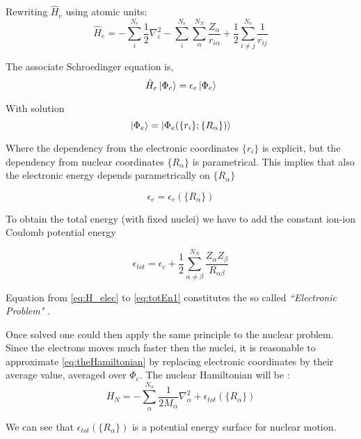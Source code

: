 \documentclass[a4paper,12pt]{article}
\begin{document}
Rewriting $\hat{H}_{e}$  using atomic units:
\begin{equation}\label{eq:H_elec}
	\hat{H}_{e} = 	- \sum_{i}^{N_{e}} \frac{1}{2} \nabla_{i}^2  
					- \sum_{i}^{N_{e}} \sum_{\alpha}^{N_{N}} \frac{Z_{\alpha}}{r_{i\alpha}}  
					+ \frac{1}{2} \sum_{i \neq j}^{N_{e}} \frac{1}{r_{ij}}
\end{equation}

The associate Schroedinger equation is,
\begin{equation}
	\hat{H}_{e} \ket{\Phi_{e}} = \epsilon_{e} \ket{\Phi_{e}}
\end{equation}

With solution
\begin{equation}
	\ket{\Phi_{e}} = \ket{\Phi_{e}( \{r_{i}\};\{R_{\alpha}\} )}
\end{equation}

Where the dependency from the electronic coordinates $\{r_i\}$ is explicit, but the dependency from nuclear coordinates $\{R_{\alpha}\}$ is parametrical.
This implies that also the electronic energy depends parametrically on $\{R_{\alpha}\}$

\begin{equation}
	\epsilon_{e} = \epsilon_{e}(\{R_{\alpha}\})
\end{equation}

To obtain the total energy (with fixed nuclei) we have to add the constant ion-ion Coulomb potential energy

\begin{equation}\label{eq:totEn1}
	\epsilon_{tot} = \epsilon_{e} + \frac{1}{2} \sum_{\alpha \neq \beta}^{N_N} \frac{Z_{\alpha} Z_{\beta} }{R_{\alpha \beta}}
\end{equation}

Equation from \eqref{eq:H_elec} to \eqref{eq:totEn1} constitutes the so called \textit{``Electronic Problem"} \cite[p.44]{Attila}.

Once solved one could then apply the same principle to the nuclear problem.
Since the electrons moves much faster then the nuclei, it is reasonable to approximate \eqref{eq:theHamiltonian} by replacing electronic coordinates by their average value, averaged over $\Phi_{e}$.
The nuclear Hamiltonian will be :
\begin{equation}
	H_{N} = - \sum_{\alpha}^{N_{\alpha}} \frac{1}{2M_{\alpha}} \nabla_{\alpha}^2 + \epsilon_{tot}(\{ R_{\alpha}\})
\end{equation}

We can see that $\epsilon_{tot}(\{ R_{\alpha}\})$ is a potential energy surface for nuclear motion.
\end{document}
